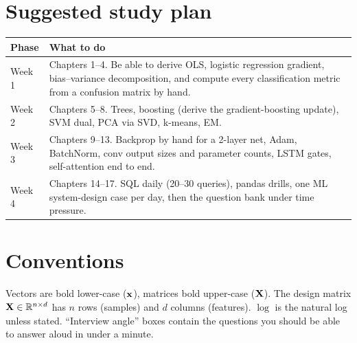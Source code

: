 \section*{Suggested study plan}
\begin{tabular}{@{}p{}p{}@{}}
\toprule
\textbf{Phase} & \textbf{What to do} \\
\midrule
Week 1 & Chapters 1--4. Be able to derive OLS, logistic regression gradient, bias--variance decomposition, and compute every classification metric from a confusion matrix by hand. \\
Week 2 & Chapters 5--8. Trees, boosting (derive the gradient-boosting update), SVM dual, PCA via SVD, k-means, EM. \\
Week 3 & Chapters 9--13. Backprop by hand for a 2-layer net, Adam, BatchNorm, conv output sizes and parameter counts, LSTM gates, self-attention end to end. \\
Week 4 & Chapters 14--17. SQL daily (20--30 queries), pandas drills, one ML system-design case per day, then the question bank under time pressure. \\
\bottomrule
\end{tabular}

\section*{Conventions}
Vectors are bold lower-case ($\mathbf{x}$), matrices bold upper-case ($\mathbf{X}$). The design matrix $\mathbf{X}\in\mathbb{R}^{n\times d}$ has $n$ rows (samples) and $d$ columns (features). $\log$ is the natural log unless stated. ``Interview angle'' boxes contain the questions you should be able to answer aloud in under a minute.

